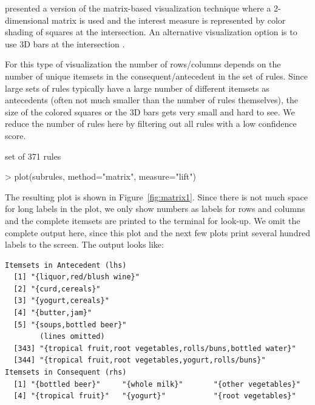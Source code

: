 \documentclass[nojss]{jss}
\begin{document}
\cite{arulesViz:Ong:2002} presented a version of the
matrix-based visualization
technique where a 2-dimensional matrix is used and the interest measure
is represented by color shading of squares at the
intersection.
An alternative visualization option is to use 3D bars at the intersection
\citep{arulesViz:Wong:1999,arulesViz:Ong:2002}.

For this type of visualization the number of rows/columns depends on the
number of unique itemsets in the consequent/antecedent in the set of
rules. Since large sets of rules typically have a large number
of different itemsets as antecedents (often not much smaller than the number of rules themselves), the size of the colored squares
or the 3D bars gets very small and hard to see.
We reduce the number of
rules here by filtering out all rules with a low confidence score.

\begin{Schunk}
\begin{Soutput}
set of 371 rules 
\end{Soutput}
\end{Schunk}

\begin{Schunk}
\begin{Sinput}
> plot(subrules, method="matrix", measure="lift")
\end{Sinput}
\end{Schunk}

The resulting plot is shown in Figure~\ref{fig:matrix1}.
Since there is not much space
for long labels in the plot, we only show numbers as
labels for rows and columns and the complete itemsets are printed to
the terminal for look-up. We omit the complete output here,
since this plot and the next few plots print several hundred labels
to the screen. The output looks like:

\begin{verbatim}
Itemsets in Antecedent (lhs)
  [1] "{liquor,red/blush wine}"
  [2] "{curd,cereals}"
  [3] "{yogurt,cereals}"
  [4] "{butter,jam}"
  [5] "{soups,bottled beer}"
	    (lines omitted)
  [343] "{tropical fruit,root vegetables,rolls/buns,bottled water}"
  [344] "{tropical fruit,root vegetables,yogurt,rolls/buns}"
Itemsets in Consequent (rhs)
  [1] "{bottled beer}"     "{whole milk}"       "{other vegetables}"
  [4] "{tropical fruit}"   "{yogurt}"           "{root vegetables}"
\end{verbatim}
\end{document}

